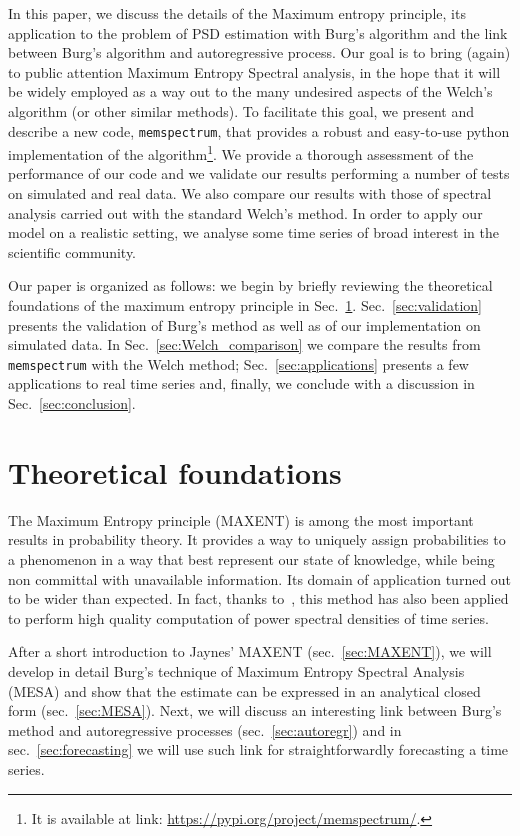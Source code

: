 \documentclass{aa}
\begin{document}
In this paper, we discuss the details of the Maximum entropy principle, its application to the problem of PSD estimation with Burg's algorithm and the link between Burg's algorithm and autoregressive process.
Our goal is to bring (again) to public attention Maximum Entropy Spectral analysis, in the hope that it will be widely employed as a way out to the many undesired aspects of the Welch's algorithm (or other similar methods).
To facilitate this goal, we present and describe a new code, \texttt{memspectrum}, that provides a robust and easy-to-use python implementation of the algorithm\footnote{
It is available at link: \url{https://pypi.org/project/memspectrum/}.
}.
We provide a thorough assessment of the performance of our code and we validate our results performing a number of tests on simulated and real data.
We also compare our results with those of spectral analysis carried out with the standard Welch's method.
In order to apply our model on a realistic setting, we analyse some time series of broad interest in the scientific community.

Our paper is organized as follows: we begin by briefly reviewing the theoretical foundations of the maximum entropy principle in Sec.~\ref{sec:foundations}. Sec.~\ref{sec:validation} presents the validation of Burg's method as well as of our implementation on simulated data. In Sec.~\ref{sec:Welch_comparison} we compare the results from \texttt{memspectrum} with the Welch method; Sec.~\ref{sec:applications} presents a few applications to real time series and, finally, we conclude with a discussion in Sec.~\ref{sec:conclusion}.


\section{Theoretical foundations}\label{sec:foundations}
The Maximum Entropy principle (MAXENT) is among the most important results in probability theory. It provides a way to uniquely assign probabilities to a phenomenon in a way that best represent our state of knowledge, while being non committal with unavailable information. Its domain of application turned out to be wider than expected. In fact, thanks to~\citet{burg1975maximum}, this method has also been applied to perform high quality computation of power spectral densities of time series.

After a short introduction to Jaynes' MAXENT (sec.~\ref{sec:MAXENT}), we will develop in detail Burg's technique of Maximum Entropy Spectral Analysis (MESA) and show that the estimate can be expressed in an analytical closed form (sec.~\ref{sec:MESA}).
Next, we will discuss an interesting link between Burg's method and autoregressive processes (sec.~\ref{sec:autoregr}) and in sec.~\ref{sec:forecasting} we will use such link for straightforwardly forecasting a time series.
\end{document}

